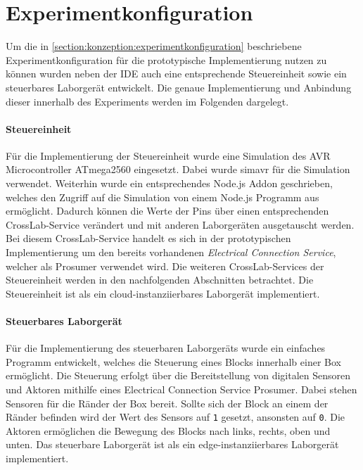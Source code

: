 \section{Experimentkonfiguration}\label{section:prototypische-implementierung:experimentkonfiguration}


Um die in \autoref{section:konzeption:experimentkonfiguration} beschriebene Experimentkonfiguration für die prototypische Implementierung nutzen zu können wurden neben der IDE auch eine entsprechende Steuereinheit sowie ein steuerbares Laborgerät entwickelt. Die genaue Implementierung und Anbindung dieser innerhalb des Experiments werden im Folgenden dargelegt.

\paragraph{Steuereinheit}
Für die Implementierung der Steuereinheit wurde eine Simulation des AVR Microcontroller ATmega2560 \cite{noauthor_atmega2560_nodate} eingesetzt. Dabei wurde simavr \cite{pollet_simavr_2025} für die Simulation verwendet. Weiterhin wurde ein entsprechendes Node.js Addon geschrieben, welches den Zugriff auf die Simulation von einem Node.js Programm aus ermöglicht. Dadurch können die Werte der Pins über einen entsprechenden CrossLab-Service verändert und mit anderen Laborgeräten ausgetauscht werden. Bei diesem CrossLab-Service handelt es sich in der prototypischen Implementierung um den bereits vorhandenen \textit{Electrical Connection Service}, welcher als Prosumer verwendet wird. Die weiteren CrossLab-Services der Steuereinheit werden in den nachfolgenden Abschnitten betrachtet. Die Steuereinheit ist als ein cloud-instanziierbares Laborgerät implementiert.

\paragraph{Steuerbares Laborgerät}
Für die Implementierung des steuerbaren Laborgeräts wurde ein einfaches Programm entwickelt, welches die Steuerung eines Blocks innerhalb einer Box ermöglicht. Die Steuerung erfolgt über die Bereitstellung von digitalen Sensoren und Aktoren mithilfe eines Electrical Connection Service Prosumer. Dabei stehen Sensoren für die Ränder der Box bereit. Sollte sich der Block an einem der Ränder befinden wird der Wert des Sensors auf \texttt{1} gesetzt, ansonsten auf \texttt{0}. Die Aktoren ermöglichen die Bewegung des Blocks nach links, rechts, oben und unten. Das steuerbare Laborgerät ist als ein edge-instanziierbares Laborgerät implementiert.

